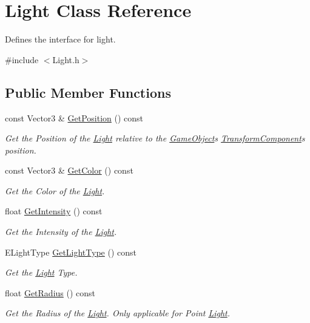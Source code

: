 \hypertarget{classLight}{}\section{Light Class Reference}
\label{classLight}


Defines the interface for light.  




{\ttfamily \#include $<$Light.\+h$>$}

\subsection*{Public Member Functions}
\begin{DoxyCompactItemize}
\item 
const Vector3 \& \hyperlink{classLight_a5183e96f3b976edc679456856c480d17}{Get\+Position} () const
\begin{DoxyCompactList}\small\item\em Get the Position of the \hyperlink{classLight}{Light} relative to the \hyperlink{classGameObject}{Game\+Object}\textquotesingle{}s \hyperlink{classTransformComponent}{Transform\+Component}\textquotesingle{}s position. \end{DoxyCompactList}\item 
const Vector3 \& \hyperlink{classLight_aff03e46ab768fd30fae4e9624532351a}{Get\+Color} () const
\begin{DoxyCompactList}\small\item\em Get the Color of the \hyperlink{classLight}{Light}. \end{DoxyCompactList}\item 
float \hyperlink{classLight_a3df6df8d3503e59227f626380b4d7a29}{Get\+Intensity} () const
\begin{DoxyCompactList}\small\item\em Get the Intensity of the \hyperlink{classLight}{Light}. \end{DoxyCompactList}\item 
E\+Light\+Type \hyperlink{classLight_ad825d936b6213b8cf49a6a2bd9516b1a}{Get\+Light\+Type} () const
\begin{DoxyCompactList}\small\item\em Get the \hyperlink{classLight}{Light} Type. \end{DoxyCompactList}\item 
float \hyperlink{classLight_acba7192fae5c7f97f41c12fb9773145c}{Get\+Radius} () const
\begin{DoxyCompactList}\small\item\em Get the Radius of the \hyperlink{classLight}{Light}. Only applicable for Point \hyperlink{classLight}{Light}. \end{DoxyCompactList}\item 

\end{DoxyCompactItemize}
